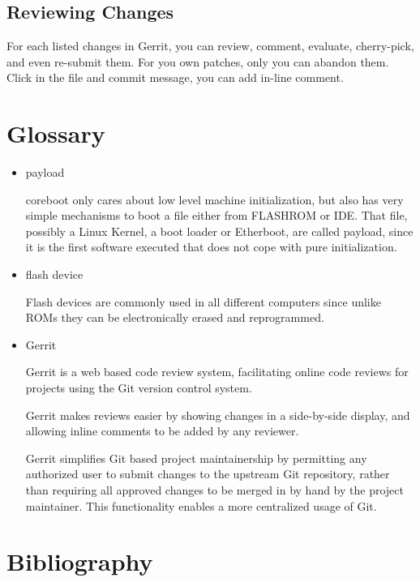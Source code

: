 \documentclass[titlepage,12pt]{article}
\begin{document}
{\subsection{Reviewing Changes}
For each listed changes in Gerrit, you can review, comment, evaluate,
cherry-pick, and even re-submit them. For you own patches, only you can
abandon them. Click in the file and commit message, you can add in-line comment.

%
%

\section{Glossary}
\begin{itemize}
\item payload

coreboot only cares about low level machine initialization, but also has
very simple mechanisms to boot a file either from FLASHROM or IDE. That
file, possibly a Linux Kernel, a boot loader or Etherboot, are called
payload, since it is the first software executed that does not cope with
pure initialization.

\item flash device

Flash devices are commonly used in all different computers since unlike
ROMs they can be electronically erased and reprogrammed.

\item Gerrit

Gerrit is a web based code review system, facilitating online code
reviews for projects using the Git version control system.

Gerrit makes reviews easier by showing changes in a side-by-side
display, and allowing inline comments to be added by any reviewer.

Gerrit simplifies Git based project maintainership by permitting any
authorized user to submit changes to the upstream Git repository, rather
than requiring all approved changes to be merged in by hand by the
project maintainer. This functionality enables a more centralized
usage of Git.

\end{itemize}

\newpage

%
%

\section{Bibliography}
}
\end{document}
